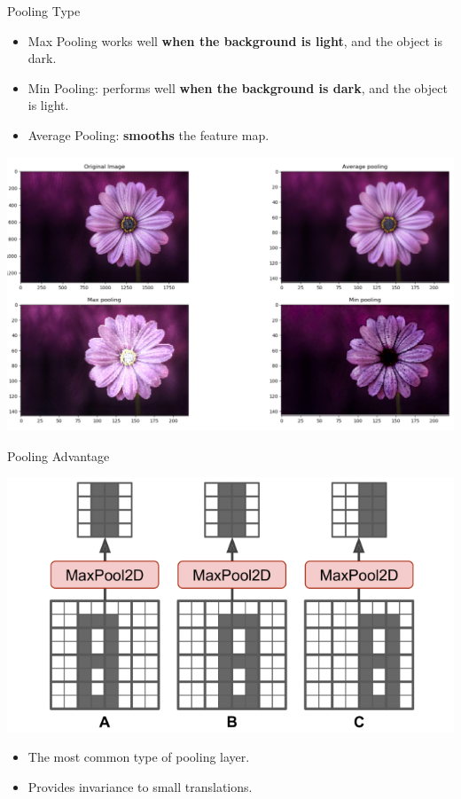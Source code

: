 \documentclass[default, aspectratio=169]{beamer}
\begin{document}
	\begin{frame}{Pooling Type}
		\begin{itemize}
			\item Max Pooling works well \textbf{when the background is light}, and the object is dark.
			\item Min Pooling: performs well \textbf{when the background is dark}, and the object is light.
			\item Average Pooling: \textbf{smooths} the feature map.
		\end{itemize}
		
		\centering
		\includegraphics[keepaspectratio, scale=0.15]{pic/Pooling_3.png}
	\end{frame}
	\begin{frame}{Pooling Advantage}
		
		\centering
		\includegraphics[keepaspectratio, scale=0.3]{pic/Pooling_4.png}
		\bigskip
		\begin{itemize}
			\item The most common type of pooling layer.
			\item Provides invariance to small translations.
		\end{itemize}
		
	\end{frame}
\end{document}
